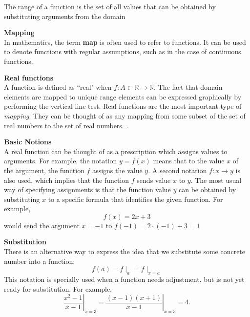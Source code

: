 \documentclass{amsart}
\begin{document}
\begin{outline}
\begin{outline}
        The range of a function is the set of all values that can be obtained by substituting arguments from the domain
      \item {\bf Mapping } \\
        In mathematics, the term \textbf{map} is often used to refer to functions. It can be used to denote functions with regular assumptions, such as in the case of continuous functions.
      \item {\bf Real functions } \\
        A function is defined as ``real" when $f: A \subset \mathbb{R} \to \mathbb{R}$. The fact that domain elements are mapped to unique range elements can be expressed graphically by performing the vertical line test. Real functions are the most important type of \textit{mapping}. They can be thought of as any mapping from some subset of the set of real numbers to the set of real numbers. \cite{mathfeld}.
      \begin{outline}
         \item {\bf Basic Notions } \\
          A real function can be thought of as a prescription which assigns values to arguments. For example, the notation $y = f(x)$ means that to the value $x$ of the argument, the function $f$ assigns the value $y$. A second notation $f: x \to y$ is also used, which implies that the function $f$ sends value $x$ to $y$. The most usual way of specifying assignments is that the function value $y$ can be obtained by substituting $x$ to a specific formula that identifies the given function. For example,
          \begin{equation*}
            f(x) = 2x + 3
          \end{equation*}
          would send the argument $x = -1$ to $f(-1) = 2 \cdot (-1) + 3 = 1$
         \item {\bf Substitution } \\
          There is an alternative way to express the idea that we substitute some concrete number into a function:
          \begin{equation*}
            f(a) = f \mid_a = f\mid_{x=a}
          \end{equation*}
          This notation is specially used when a function needs adjustment, but is not yet ready for substitution. For example,
          \begin{equation*}
            \left.\frac{x^2 - 1}{x-1}\right\rvert_{x=3} = \left.\frac{(x-1)(x+1)}{x-1}\right\rvert_{x=3} = 4.
          \end{equation*}

\end{outline}
\end{outline}
\end{outline}
\end{document}
